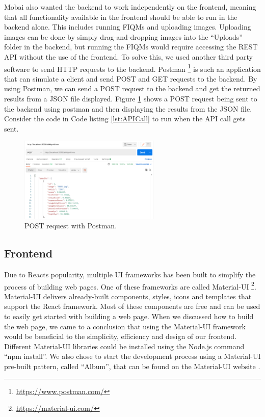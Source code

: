 Mobai also wanted the backend to work independently on the frontend, meaning that all functionality available in the frontend should be able to run in the backend alone. This includes running FIQMs and uploading images. Uploading images can be done by simply drag-and-dropping images into the ``Uploads'' folder in the backend, but running the FIQMs would require accessing the REST API without the use of the frontend. To solve this, we used another third party software to send HTTP requests to the backend. Postman \footnote{\url{https://www.postman.com/}} is such an application that can simulate a client and send POST and GET requests to the backend. By using Postman, we can send a POST request to the backend and get the returned results from a JSON file displayed. Figure \ref{fig:postman} shows a POST request being sent to the backend using postman and then displaying the results from the JSON file. Consider the code in Code listing \ref{lst:APICall} to run when the API call gets sent. 

\begin{figure}[h]
    \centering
    \includegraphics[width=0.6\textwidth]
    {figures/postman_json.PNG}
    \caption{POST request with Postman.}
    \label{fig:postman}
\end{figure}

\subsection{Frontend}
Due to Reacts popularity, multiple UI frameworks has been built to simplify the process of building web pages. One of these frameworks are called Material-UI \footnote{\url{https://material-ui.com/}}. Material-UI delivers already-built components, styles, icons and templates that support the React framework. Most of these components are free and can be used to easily get started with building a web page. When we discussed how to build the web page, we came to a conclusion that using the Material-UI framework would be beneficial to the simplicity, efficiency and design of our frontend. Different Material-UI libraries could be installed using the Node.js command ``npm install''. We also chose to start the development process using a Material-UI pre-built pattern, called ``Album'', that can be found on the Material-UI website \cite{MaterialUI}. 

